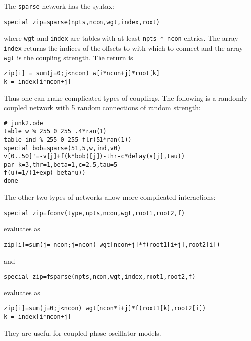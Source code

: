 \documentclass{article}
\begin{document}
The {\tt sparse} network has the syntax:
\begin{verbatim}
special zip=sparse(npts,ncon,wgt,index,root)
\end{verbatim}
where {\tt wgt} and {\tt index} are tables with at least {\tt npts *
ncon} entries.   The array {\tt index} returns the indices of the
offsets to with which to connect and the array {\tt wgt} is the
coupling strength. The return is
\begin{verbatim}
zip[i] = sum(j=0;j<ncon) w[i*ncon+j]*root[k]
k = index[i*ncon+j]
\end{verbatim}
Thus one can make complicated types of couplings. The following is a
randomly coupled network with 5 random connections of random strength:
\begin{verbatim}
# junk2.ode
table w % 255 0 255 .4*ran(1)
table ind % 255 0 255 flr(51*ran(1))
special bob=sparse(51,5,w,ind,v0)
v[0..50]'=-v[j]+f(k*bob([j])-thr-c*delay(v[j],tau))
par k=3,thr=1,beta=1,c=2.5,tau=5
f(u)=1/(1+exp(-beta*u))
done
\end{verbatim}

The other two types of networks allow more complicated interactions:
\begin{verbatim}
special zip=fconv(type,npts,ncon,wgt,root1,root2,f)
\end{verbatim}
evaluates as
\begin{verbatim}
zip[i]=sum(j=-ncon;j=ncon) wgt[ncon+j]*f(root1[i+j],root2[i])
\end{verbatim}

and

\begin{verbatim}
special zip=fsparse(npts,ncon,wgt,index,root1,root2,f)
\end{verbatim}
evaluates as
\begin{verbatim}
zip[i]=sum(j=0;j<ncon) wgt[ncon*i+j]*f(root1[k],root2[i])
k = index[i*ncon+j]
\end{verbatim}

They are useful for coupled phase oscillator models.
\end{document}
